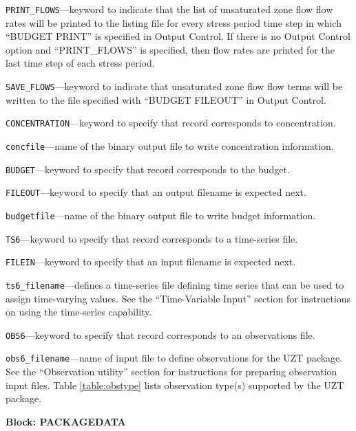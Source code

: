 \begin{description}
\item \texttt{PRINT\_FLOWS}---keyword to indicate that the list of unsaturated zone flow flow rates will be printed to the listing file for every stress period time step in which ``BUDGET PRINT'' is specified in Output Control.  If there is no Output Control option and ``PRINT\_FLOWS'' is specified, then flow rates are printed for the last time step of each stress period.

\item \texttt{SAVE\_FLOWS}---keyword to indicate that unsaturated zone flow flow terms will be written to the file specified with ``BUDGET FILEOUT'' in Output Control.

\item \texttt{CONCENTRATION}---keyword to specify that record corresponds to concentration.

\item \texttt{concfile}---name of the binary output file to write concentration information.

\item \texttt{BUDGET}---keyword to specify that record corresponds to the budget.

\item \texttt{FILEOUT}---keyword to specify that an output filename is expected next.

\item \texttt{budgetfile}---name of the binary output file to write budget information.

\item \texttt{TS6}---keyword to specify that record corresponds to a time-series file.

\item \texttt{FILEIN}---keyword to specify that an input filename is expected next.

\item \texttt{ts6\_filename}---defines a time-series file defining time series that can be used to assign time-varying values. See the ``Time-Variable Input'' section for instructions on using the time-series capability.

\item \texttt{OBS6}---keyword to specify that record corresponds to an observations file.

\item \texttt{obs6\_filename}---name of input file to define observations for the UZT package. See the ``Observation utility'' section for instructions for preparing observation input files. Table \ref{table:obstype} lists observation type(s) supported by the UZT package.

\end{description}
\item \textbf{Block: PACKAGEDATA}

